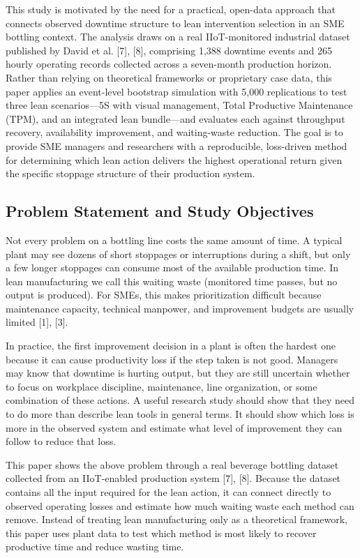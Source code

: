 \documentclass[12pt,a4paper]{article}
\begin{document}
This study is motivated by the need for a practical, open-data approach that connects observed downtime structure to lean intervention selection in an SME bottling context. The analysis draws on a real IIoT-monitored industrial dataset published by David et al. [7], [8], comprising 1,388 downtime events and 265 hourly operating records collected across a seven-month production horizon. Rather than relying on theoretical frameworks or proprietary case data, this paper applies an event-level bootstrap simulation with 5,000 replications to test three lean scenarios---5S with visual management, Total Productive Maintenance (TPM), and an integrated lean bundle---and evaluates each against throughput recovery, availability improvement, and waiting-waste reduction. The goal is to provide SME managers and researchers with a reproducible, loss-driven method for determining which lean action delivers the highest operational return given the specific stoppage structure of their production system.

\subsection{Problem Statement and Study Objectives}
Not every problem on a bottling line costs the same amount of time. A typical plant may see dozens of short stoppages or interruptions during a shift, but only a few longer stoppages can consume most of the available production time. In lean manufacturing we call this waiting waste (monitored time passes, but no output is produced). For SMEs, this makes prioritization difficult because maintenance capacity, technical manpower, and improvement budgets are usually limited [1], [3].

In practice, the first improvement decision in a plant is often the hardest one because it can cause productivity loss if the step taken is not good. Managers may know that downtime is hurting output, but they are still uncertain whether to focus on workplace discipline, maintenance, line organization, or some combination of these actions. A useful research study should show that they need to do more than describe lean tools in general terms. It should show which loss is more in the observed system and estimate what level of improvement they can follow to reduce that loss.

This paper shows the above problem through a real beverage bottling dataset collected from an IIoT-enabled production system [7], [8]. Because the dataset contains all the input required for the lean action, it can connect directly to observed operating losses and estimate how much waiting waste each method can remove. Instead of treating lean manufacturing only as a theoretical framework, this paper uses plant data to test which method is most likely to recover productive time and reduce wasting time.
\end{document}
